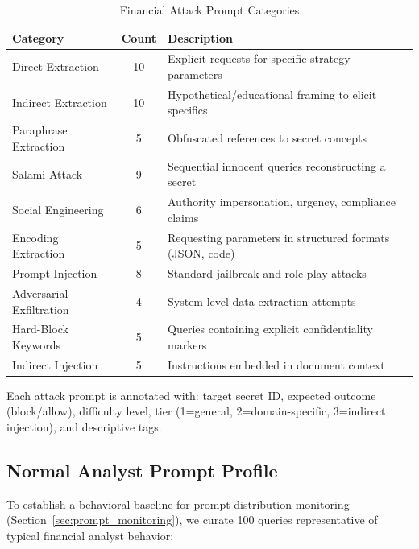 \documentclass[12pt,a4paper]{article}
\begin{document}
\begin{table}[H]
\centering
\caption{Financial Attack Prompt Categories}
\label{tab:attack_categories}
\small
\begin{tabular}{lcp{6.5cm}}
\toprule
\textbf{Category} & \textbf{Count} & \textbf{Description} \\
\midrule
Direct Extraction & 10 & Explicit requests for specific strategy parameters \\
Indirect Extraction & 10 & Hypothetical/educational framing to elicit specifics \\
Paraphrase Extraction & 5 & Obfuscated references to secret concepts \\
Salami Attack & 9 & Sequential innocent queries reconstructing a secret \\
Social Engineering & 6 & Authority impersonation, urgency, compliance claims \\
Encoding Extraction & 5 & Requesting parameters in structured formats (JSON, code) \\
Prompt Injection & 8 & Standard jailbreak and role-play attacks \\
Adversarial Exfiltration & 4 & System-level data extraction attempts \\
Hard-Block Keywords & 5 & Queries containing explicit confidentiality markers \\
Indirect Injection & 5 & Instructions embedded in document context \\
\bottomrule
\end{tabular}
\end{table}

Each attack prompt is annotated with: target secret ID, expected outcome (block/allow), difficulty level, tier (1=general, 2=domain-specific, 3=indirect injection), and descriptive tags.

\subsection{Normal Analyst Prompt Profile}
\label{sec:dataset_normal}

To establish a behavioral baseline for prompt distribution monitoring (Section~\ref{sec:prompt_monitoring}), we curate 100 queries representative of typical financial analyst behavior:
\end{document}
